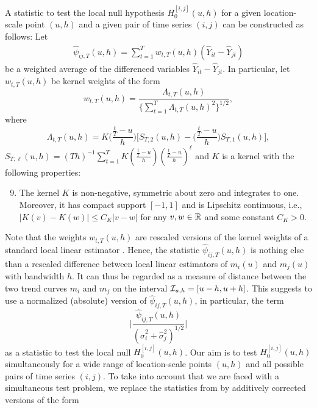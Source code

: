 \documentclass[12pt]{article}
\makeatletter
\renewcommand{\eqref}[1]{\tagform@{\ref{#1}}}
\makeatother
\begin{document}
A statistic to test the local null hypothesis $H_0^{[i, j]}(u, h)$ for a given location-scale point $(u,h)$ and a given pair of time series $(i,j)$ can be constructed as follows: Let
\begin{align}
\widehat{\psi}_{ij, T}(u, h) = \sum\limits_{t=1}^T w_{t,T}(u, h)(\widehat{Y}_{it} - \widehat{Y}_{jt}) \label{eq:psi_hat_ij}
\end{align}
be a weighted average of the differenced variables $\widehat{Y}_{it} - \widehat{Y}_{jt}$. In particular, let $w_{t,T}(u, h)$ be kernel weights of the form
\begin{equation}\label{eq:weights}
w_{t,T}(u, h) = \frac{\Lambda_{t,T}(u, h)}{ \{\sum\nolimits_{t=1}^T \Lambda_{t,T}(u, h)^2 \}^{1/2} }, 
\end{equation}
where
\[ \Lambda_{t,T}(u, h) = K\Big(\frac{\frac{t}{T}-u}{h}\Big) \Big[ S_{T,2}(u, h) - \Big(\frac{\frac{t}{T}-u}{h}\Big) S_{T,1}(u, h) \Big], \]
$S_{T,\ell}(u, h) = (Th)^{-1} \sum\nolimits_{t=1}^T K(\frac{\frac{t}{T}-u}{h}) (\frac{\frac{t}{T}-u}{h})^\ell$ and $K$ is a kernel with the following properties: 
\begin{enumerate}[label=(C\arabic*),leftmargin=1.05cm,topsep=3pt]
\setcounter{enumi}{8}
\item \label{C-ker} The kernel $K$ is non-negative, symmetric about zero and integrates to one. Moreover, it has compact support $[-1,1]$ and is Lipschitz continuous, i.e., $|K(v) - K(w)| \le C_K |v-w|$ for any $v, w \in \mathbb{R}$ and some constant $C_K > 0$.
\end{enumerate}
Note that the weights $w_{t,T}(u,h)$ are rescaled versions of the kernel weights of a standard local linear estimator \citep{FanGijbels1996}. Hence, the statistic $\widehat{\psi}_{ij, T}(u, h)$ is nothing else than a rescaled difference between local linear estimators of $m_i(u)$ and $m_j(u)$ with bandwidth $h$. It can thus be regarded as a measure of distance between the two trend curves $m_i$ and $m_j$ on the interval $\mathcal{I}_{u, h} = [u-h, u+h]$. This suggests to use a normalized (absolute) version of $\widehat{\psi}_{ij, T}(u, h)$, in particular, the term 
\begin{equation}\label{eq:local-stat-without-correction}
\Big| \frac{\widehat{\psi}_{ij, T}(u, h)}{(\widehat{\sigma}_i^2 + \widehat{\sigma}_j^2)^{1/2}} \Big|
\end{equation}
as a statistic to test the local null $H_0^{[i, j]}(u, h)$. Our aim is to test $H_0^{[i, j]}(u, h)$ simultaneously for a wide range of location-scale points $(u,h)$ and all possible pairs of time series $(i,j)$. To take into account that we are faced with a simultaneous test problem, we replace the statistics from \eqref{eq:local-stat-without-correction} by additively corrected versions of the form 
\end{document}
